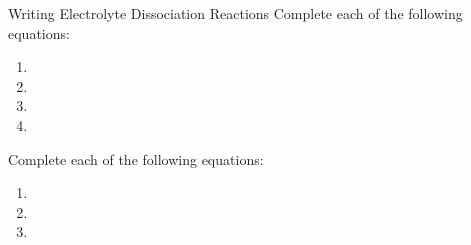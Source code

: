 \documentclass[11pt,letterpaper]{article}
\begin{document}
\begin{frame}[t]{Writing Electrolyte Dissociation Reactions}
	Complete each of the following equations:

	\vspace{1em}

	\begin{enumerate}
		\item {}
			\vspace{2em}
		\item {}
			\vspace{2em}
		\item {}
			\vspace{2em}
		\item {}
			\vspace{2em}
	\end{enumerate}
\end{frame}

\begin{onyourown}[0em]
	Complete each of the following equations:

	\vspace{1em}

	\begin{enumerate}
		\item {}
			\vspace{2em}
		\item {}
			\vspace{2em}
		\item {}
			\vspace{2em}
	\end{enumerate}
\end{onyourown}
\end{document}
